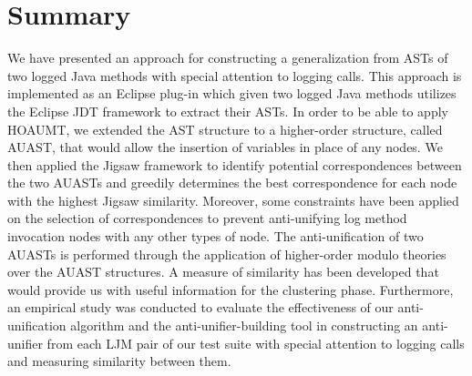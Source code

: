 \section{Summary} \label{meth1-summary}
We have presented an approach for constructing a generalization from ASTs of two logged Java methods with special attention to logging calls. This approach is implemented as an Eclipse plug-in which given two logged Java methods utilizes the Eclipse JDT framework to extract their ASTs. In order to be able to apply HOAUMT, we extended the AST structure to a higher-order structure, called AUAST, that would allow the insertion of variables in place of any nodes. We then applied the Jigsaw framework to identify potential correspondences between the two AUASTs and greedily determines the best correspondence for each node with the highest Jigsaw similarity.  Moreover, some constraints have been applied on the selection of correspondences to prevent anti-unifying log method invocation nodes with any other types of node. The anti-unification of two AUASTs is performed through the application of higher-order modulo theories over the AUAST structures. A measure of similarity has been developed that would provide us with useful information for the clustering phase. Furthermore, an empirical study was conducted to evaluate the effectiveness of our anti-unification algorithm and the anti-unifier-building tool in constructing an anti-unifier from each LJM pair of our test suite with special attention to logging calls and measuring similarity between them.  
